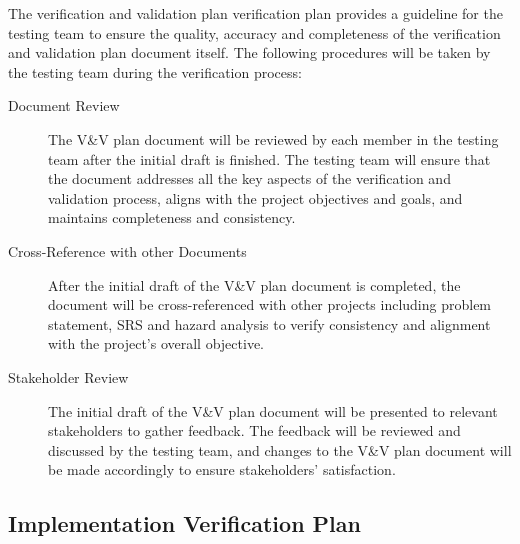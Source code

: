 \documentclass[12pt, titlepage]{article}
\begin{document}
The verification and validation plan verification plan provides a guideline for
the testing team to ensure the quality, accuracy and completeness of the
verification and validation plan document itself. The following procedures will
be taken by the testing team during the verification process:
\begin{description}
\item[Document Review] The V\&V plan document will be reviewed by each member in
  the testing team after the initial draft is finished. The testing team will
  ensure that the document addresses all the key aspects of the verification and
  validation process, aligns with the project objectives and goals, and
  maintains completeness and consistency.
\item[Cross-Reference with other Documents] After the initial draft of the V\&V
  plan document is completed, the document will be cross-referenced with other
  projects including problem statement, SRS and hazard analysis to verify
  consistency and alignment with the project’s overall objective.
\item[Stakeholder Review] The initial draft of the V\&V plan document will be
  presented to relevant stakeholders to gather feedback. The feedback will be
  reviewed and discussed by the testing team, and changes to the V\&V plan
  document will be made accordingly to ensure stakeholders’ satisfaction.
\end{description}

\subsection{Implementation Verification Plan}
\end{document}
